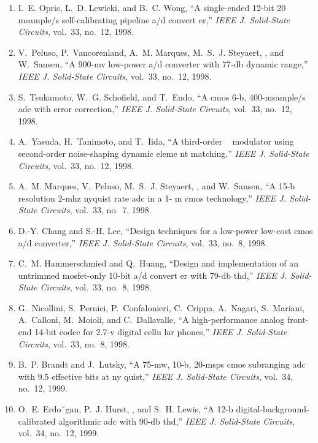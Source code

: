 \begin{enumerate}
\item
I.~E. Opris, L.~D. Lewicki, and B.~C. Wong, ``A single-ended 12-bit 20
  msample/s self-calibrating pipeline a/d convert er,'' \emph{{IEEE} J.
  Solid-State Circuits}, vol.~33, no.~12, 1998.

\item
V.~Peluso, P.~Vancorenland, A.~M. Marques, M.~S.~J. Steyaert, , and W.~Sansen,
  ``A 900-mv low-power a/d converter with 77-db dynamic range,'' \emph{{IEEE}
  J. Solid-State Circuits}, vol.~33, no.~12, 1998.

\item
S.~Tsukamoto, W.~G. Schoﬁeld, and T.~Endo, ``A cmos 6-b, 400-msample/s adc
  with error correction,'' \emph{{IEEE} J. Solid-State Circuits}, vol.~33,
  no.~12, 1998.

\item
A.~Yasuda, H.~Tanimoto, and T.~Iida, ``A third-order ~ modulator using
  second-order noise-shaping dynamic eleme nt matching,'' \emph{{IEEE} J.
  Solid-State Circuits}, vol.~33, no.~12, 1998.

\item
A.~M. Marques, V.~Peluso, M.~S.~J. Steyaert, , and W.~Sansen, ``A 15-b
  resolution 2-mhz nyquist rate adc in a 1- m cmos technology,'' \emph{{IEEE}
  J. Solid-State Circuits}, vol.~33, no.~7, 1998.

\item
D.-Y. Chang and S.-H. Lee, ``Design techniques for a low-power low-cost cmos
  a/d converter,'' \emph{{IEEE} J. Solid-State Circuits}, vol.~33, no.~8, 1998.

\item
C.~M. Hammerschmied and Q.~Huang, ``Design and implementation of an untrimmed
  mosfet-only 10-bit a/d convert er with 79-db thd,'' \emph{{IEEE} J.
  Solid-State Circuits}, vol.~33, no.~8, 1998.

\item
G.~Nicollini, S.~Pernici, P.~Confalonieri, C.~Crippa, A.~Nagari, S.~Mariani,
  A.~Calloni, M.~Moioli, and C.~Dallavalle, ``A high-performance analog
  front-end 14-bit codec for 2.7-v digital cellu lar phones,'' \emph{{IEEE} J.
  Solid-State Circuits}, vol.~33, no.~8, 1998.

\item
B.~P. Brandt and J.~Lutsky, ``A 75-mw, 10-b, 20-msps cmos subranging adc with
  9.5 effective bits at ny quist,'' \emph{{IEEE} J. Solid-State Circuits},
  vol.~34, no.~12, 1999.

\item
O.~E. Erdo˘gan, P.~J. Hurst, , and S.~H. Lewis, ``A 12-b
  digital-background-calibrated algorithmic adc with 90-db thd,'' \emph{{IEEE}
  J. Solid-State Circuits}, vol.~34, no.~12, 1999.


\end{enumerate}
